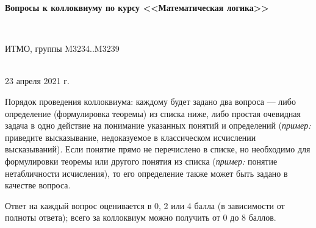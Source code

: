 \documentclass[11pt,a4paper,oneside]{article}
\begin{document}
\begin{center}
\begin{Large}{\bfseries Вопросы к коллоквиуму по курсу <<Математическая логика>>}\end{Large}\\
\vspace{1mm}
\begin{small} ИТМО, группы M3234..M3239\end{small}\\
\small 23 апреля 2021 г.
\end{center}

Порядок проведения коллоквиума: каждому будет задано два вопроса --- либо
определение (формулировка теоремы) из списка ниже, либо простая очевидная
задача в одно действие на понимание указанных понятий и определений
(\emph{пример:} приведите высказывание, недоказуемое в 
классическом исчислении высказываний). Если понятие прямо не перечислено
в списке, но необходимо для формулировки теоремы или другого понятия из 
списка (\emph{пример:} понятие нетабличности исчисления), то его определение 
также может быть задано в качестве вопроса.

Ответ на каждый вопрос оценивается в 0, 2 или 4 балла (в зависимости от полноты
ответа); всего за коллоквиум можно получить от 0 до 8 баллов.
\end{document}
